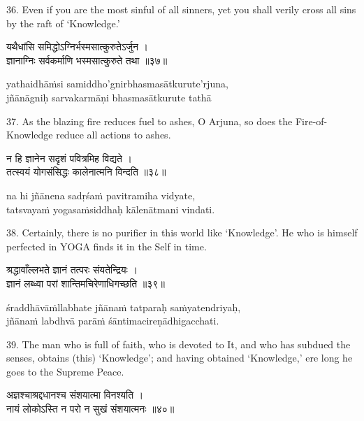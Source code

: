 36. Even if you are the most sinful of all sinners, yet you shall verily cross
all sins by the raft of `Knowledge.'

\begin{gitaverse}
यथैधांसि समिद्धोऽग्निर्भस्मसात्कुरुतेऽर्जुन । \\
ज्ञानाग्निः सर्वकर्माणि भस्मसात्कुरुते तथा ॥३७॥
\end{gitaverse}

\begin{transliteration}
yathaidhāṁsi samiddho'gnirbhasmasātkurute'rjuna, \\
jñānāgniḥ sarvakarmāṇi bhasmasātkurute tathā
\end{transliteration}

37. As the blazing fire reduces fuel to ashes, O Arjuna, so does the
Fire-of-Knowledge reduce all actions to ashes.

\begin{gitaverse}
न हि ज्ञानेन सदृशं पवित्रमिह विद्यते । \\
तत्स्वयं योगसंसिद्धः कालेनात्मनि विन्दति ॥३८॥
\end{gitaverse}

\begin{transliteration}
na hi jñānena sadṛśaṁ pavitramiha vidyate, \\
tatsvayaṁ yogasaṁsiddhaḥ kālenātmani vindati.
\end{transliteration}

38. Certainly, there is no purifier in this world like `Knowledge'. He who is
himself perfected in YOGA finds it in the Self in time.

\begin{gitaverse}
श्रद्धावाँल्लभते ज्ञानं तत्परः संयतेन्द्रियः । \\
ज्ञानं लब्ध्वा परां शान्तिमचिरेणाधिगच्छति ॥३९॥
\end{gitaverse}

\begin{transliteration}
śraddhāvāṁllabhate jñānaṁ tatparaḥ saṁyatendriyaḥ, \\
jñānaṁ labdhvā parāṁ śāntimacireṇādhigacchati.
\end{transliteration}

39. The man who is full of faith, who is devoted to It, and who has subdued the
senses, obtains (this) `Knowledge'; and having obtained `Knowledge,' ere long
he goes to the Supreme Peace.

\begin{gitaverse}
अज्ञश्चाश्रद्दधानश्च संशयात्मा विनश्यति । \\
नायं लोकोऽस्ति न परो न सुखं संशयात्मनः ॥४०॥
\end{gitaverse}

